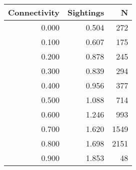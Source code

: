 \begin{tabular}{rrr}
\toprule
 Connectivity &  Sightings &    N \\
\midrule
        0.000 &      0.504 &  272 \\
        0.100 &      0.607 &  175 \\
        0.200 &      0.878 &  245 \\
        0.300 &      0.839 &  294 \\
        0.400 &      0.956 &  377 \\
        0.500 &      1.088 &  714 \\
        0.600 &      1.246 &  993 \\
        0.700 &      1.620 & 1549 \\
        0.800 &      1.698 & 2151 \\
        0.900 &      1.853 &   48 \\
\bottomrule
\end{tabular}
